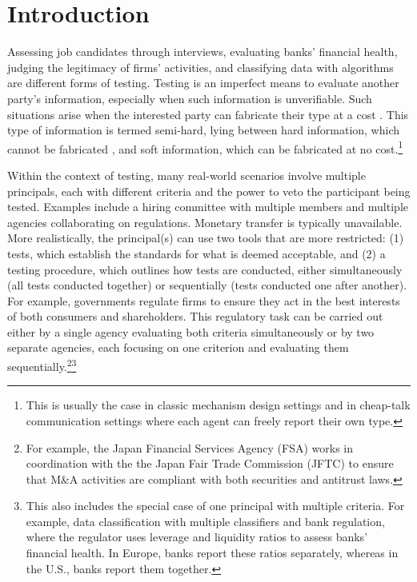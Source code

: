 \section{Introduction}
Assessing job candidates through interviews, evaluating banks' financial health, judging the legitimacy of firms' activities, and classifying data with algorithms are different forms of testing.
Testing is an imperfect means to evaluate another party's information, especially when such information is unverifiable. 
Such situations arise when the interested party can fabricate their type at a cost \citep{perez2022test,perez2024score,li2023screening}.
This type of information is termed semi-hard, lying between hard information, which cannot be fabricated \citep{green1986partially}, and soft information, which can be fabricated at no cost.\footnote{This is usually the case in classic mechanism design settings and in cheap-talk communication settings where each agent can freely report their own type.}

Within the context of testing, many real-world scenarios involve multiple principals, each with different criteria and the power to veto the participant being tested.
Examples include a hiring committee with multiple members and multiple agencies collaborating on regulations. 
  Monetary transfer is typically unavailable. 
  More realistically, the principal(s) can use two tools that are more restricted: (1) tests, which establish the standards for what is deemed acceptable, and (2) a testing procedure, which outlines how tests are conducted, either simultaneously (all tests conducted together) or sequentially (tests conducted one after another).  For example, governments regulate firms to ensure they act in the best interests of both consumers and shareholders. This regulatory task can be carried out either by a single agency evaluating both criteria simultaneously or by two separate agencies, each focusing on one criterion and evaluating them sequentially.\footnote{For example, the Japan Financial Services Agency (FSA) works in coordination with the the Japan Fair Trade Commission (JFTC) to ensure that M\&A activities are compliant with both securities and antitrust laws.}\footnote{This also includes the special case of one principal with multiple criteria. For example, data classification with multiple classifiers and bank regulation, where the regulator uses leverage and liquidity ratios to assess banks' financial health. In Europe, banks report these ratios separately, whereas in the U.S., banks report them together.}

